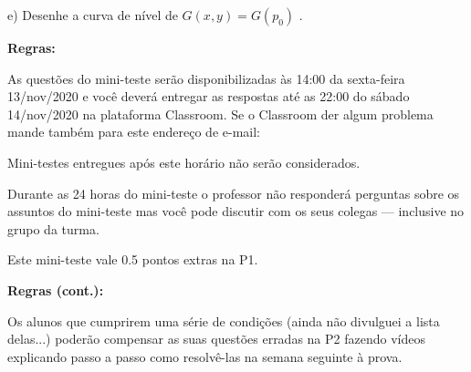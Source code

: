 \documentclass[oneside,12pt]{article}
\begin{document}
e) Desenhe a curva de nível de $G(x,y) = G(p_0)$ .


\newpage


{\bf Regras:}

As questões do mini-teste serão disponibilizadas às 14:00 da
sexta-feira 13/nov/2020 e você deverá entregar as respostas
 até as 22:00 do sábado 14/nov/2020 na
plataforma Classroom. Se o Classroom der algum problema mande também
para este endereço de e-mail:

\ssk


\ssk

Mini-testes entregues após este horário não serão considerados.

Durante as 24 horas do mini-teste o professor não responderá perguntas
sobre os assuntos do mini-teste mas você pode discutir com os seus
colegas --- inclusive no grupo da turma.

Este mini-teste vale 0.5 pontos extras na P1.

\newpage

{\bf Regras (cont.):}

\ssk

Os alunos que cumprirem uma série de condições (ainda não divulguei a
lista delas...) poderão compensar as suas questões erradas na P2
fazendo vídeos explicando passo a passo como resolvê-las na semana
seguinte à prova. 
\end{document}
